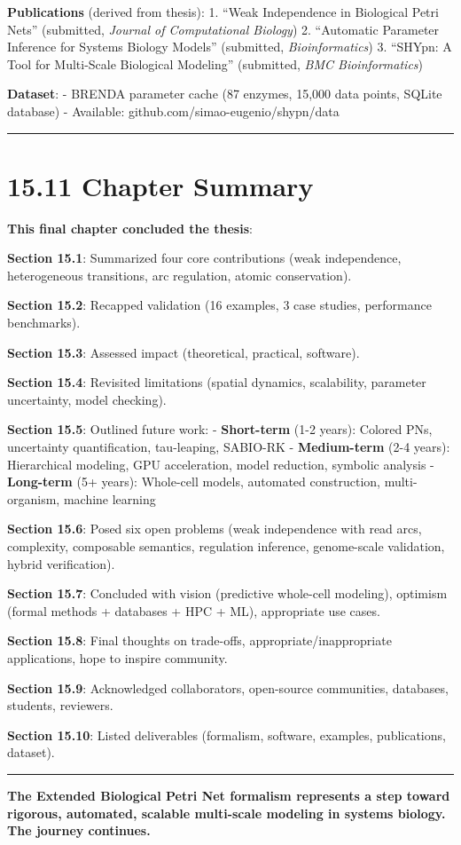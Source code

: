 \textbf{Publications} (derived from thesis): 1. ``Weak Independence in
Biological Petri Nets'' (submitted, \emph{Journal of Computational
Biology}) 2. ``Automatic Parameter Inference for Systems Biology
Models'' (submitted, \emph{Bioinformatics}) 3. ``SHYpn: A Tool for
Multi-Scale Biological Modeling'' (submitted, \emph{BMC Bioinformatics})

\textbf{Dataset}: - BRENDA parameter cache (87 enzymes, 15,000 data
points, SQLite database) - Available:
github.com/simao-eugenio/shypn/data

\begin{center}\rule{0.5\linewidth}{0.5pt}\end{center}

\hypertarget{chapter-summary}{%
\section{15.11 Chapter Summary}\label{chapter-summary}}

\textbf{This final chapter concluded the thesis}:

\textbf{Section 15.1}: Summarized four core contributions (weak
independence, heterogeneous transitions, arc regulation, atomic
conservation).

\textbf{Section 15.2}: Recapped validation (16 examples, 3 case studies,
performance benchmarks).

\textbf{Section 15.3}: Assessed impact (theoretical, practical,
software).

\textbf{Section 15.4}: Revisited limitations (spatial dynamics,
scalability, parameter uncertainty, model checking).

\textbf{Section 15.5}: Outlined future work: - \textbf{Short-term} (1-2
years): Colored PNs, uncertainty quantification, tau-leaping, SABIO-RK -
\textbf{Medium-term} (2-4 years): Hierarchical modeling, GPU
acceleration, model reduction, symbolic analysis - \textbf{Long-term}
(5+ years): Whole-cell models, automated construction, multi-organism,
machine learning

\textbf{Section 15.6}: Posed six open problems (weak independence with
read arcs, complexity, composable semantics, regulation inference,
genome-scale validation, hybrid verification).

\textbf{Section 15.7}: Concluded with vision (predictive whole-cell
modeling), optimism (formal methods + databases + HPC + ML), appropriate
use cases.

\textbf{Section 15.8}: Final thoughts on trade-offs,
appropriate/inappropriate applications, hope to inspire community.

\textbf{Section 15.9}: Acknowledged collaborators, open-source
communities, databases, students, reviewers.

\textbf{Section 15.10}: Listed deliverables (formalism, software,
examples, publications, dataset).

\begin{center}\rule{0.5\linewidth}{0.5pt}\end{center}

\textbf{The Extended Biological Petri Net formalism represents a step
toward rigorous, automated, scalable multi-scale modeling in systems
biology. The journey continues.}
